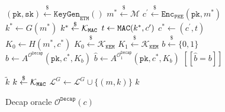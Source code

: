 \documentclass[letterpaper,12pt,titlepage,oneside,final]{book}
\newcommand{\pke}{\texttt{PKE}}
\newcommand{\keygen}{\texttt{KeyGen}}
\newcommand{\encrypt}{\texttt{Enc}}
\newcommand{\kem}{\texttt{KEM}}
\newcommand{\decap}{\texttt{Decap}}
\newcommand{\etm}{{\texttt{ETM}}}  %
\newcommand{\mac}{\texttt{\texttt{MAC}}}
\newcommand{\pk}{\texttt{pk}}
\newcommand{\sk}{\texttt{sk}}
\newcommand{\leftsample}{\stackrel{\$}{\leftarrow}}
\newcommand{\llbrack}{[\![}
\newcommand{\rrbrack}{]\!]}
\begin{document}
\begin{figure}[htbp]
    \centering
    \begin{minipage}[t]{0.46\textwidth}
        \begin{algorithm}[H]
            \caption*{\texttt{IND-CCA} game for $\kem_\etm$}
            \begin{algorithmic}[1]
                \State $(\pk, \sk) \leftsample \keygen_\etm()$
                \State $m^\ast \leftsample \mathcal{M}$
                \State $c^\prime \leftsample \encrypt_\pke(\pk, m^\ast)$
                \State $k^\ast \leftarrow G(m^\ast)$
                \State $k^\ast \leftsample \mathcal{K}_\mac$
                \State $t \leftarrow \mac(k^\ast, c^\prime)$
                \State $c^\ast \leftarrow (c^\prime, t)$
                \State $K_0 \leftarrow H(m^\ast, c^\ast)$
                \State $K_0 \leftsample \mathcal{K}_\kem$
                \State $K_1 \leftsample \mathcal{K}_\kem$
                \State $b \leftsample \{0,1\}$
                \State $\hat{b} \leftarrow A^{\mathcal{O}^\decap}(\pk, c^\ast, K_b)$
                \State $\hat{b} \leftarrow A^{\mathcal{O}^\decap_1}(\pk, c^\ast, K_b)$
                \State \Return $\llbrack \hat{b} = b \rrbrack$
            \end{algorithmic}
        \end{algorithm}\vspace{-0em}
        \begin{algorithm}[H]
            \caption*{Hash oracle $\mathcal{O}^G(m)$}
            \begin{algorithmic}[1]
                    \State \Return $\tilde{k}$
                \EndIf
                \State $k \leftsample \mathcal{K}_\mac$
                \State $\mathcal{L}^G \leftarrow \mathcal{L}^G \cup \{(m, k)\}$
                \State \Return $k$
            \end{algorithmic}
        \end{algorithm}
    \end{minipage}
    \begin{minipage}[t]{0.53\textwidth}
        \begin{algorithm}[H]
            \caption*{Decap oracle $\mathcal{O}^\decap(c)$}
            \begin{algorithmic}[1]

\end{algorithmic}
\end{algorithm}
\end{minipage}
\end{figure}
\end{document}
